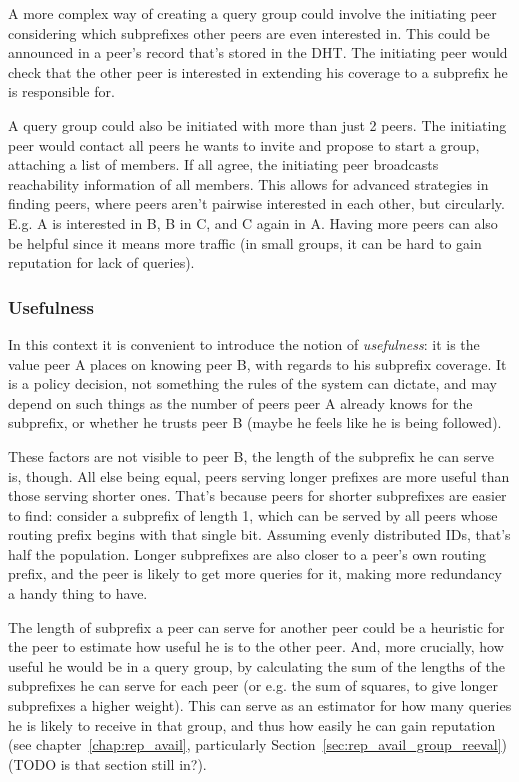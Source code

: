 A more complex way of creating a query group could involve the initiating peer
considering which subprefixes other peers are even interested in. This could be
announced in a peer's record that's stored in the DHT. The initiating peer would
check that the other peer is interested in extending his coverage to a subprefix
he is responsible for.

A query group could also be initiated with more than just 2 peers. The
initiating peer would contact all peers he wants to invite and propose to start
a group, attaching a list of members. If all agree, the initiating peer
broadcasts reachability information of all members. This allows for advanced
strategies in finding peers, where peers aren't pairwise interested in each
other, but circularly. E.g. A is interested in B, B in C, and C again in A.
Having more peers can also be helpful since it means more traffic (in small
groups, it can be hard to gain reputation for lack of queries).

\subsubsection{Usefulness}
\label{sec:desc_usefulness}
In this context it is convenient to introduce the notion of \emph{usefulness}:
it is the value peer A places on knowing peer B, with regards to his subprefix
coverage. It is a policy decision, not something the rules of the system can
dictate, and may depend on such things as the number of peers peer A already
knows for the subprefix, or whether he trusts peer B (maybe he feels like he is
being followed).

These factors are not visible to peer B, the length of the subprefix he can
serve is, though. All else being equal, peers serving longer prefixes are more
useful than those serving shorter ones. That's because peers for shorter
subprefixes are easier to find: consider a subprefix of length 1, which can be
served by all peers whose routing prefix begins with that single bit. Assuming
evenly distributed IDs, that's half the population. Longer subprefixes are also
closer to a peer's own routing prefix, and the peer is likely to get more
queries for it, making more redundancy a handy thing to have.

The length of subprefix a peer can serve for another peer could be a heuristic
for the peer to estimate how useful he is to the other peer. And, more
crucially, how useful he would be in a query group, by calculating the sum of
the lengths of the subprefixes he can serve for each peer (or e.g. the sum of
squares, to give longer subprefixes a higher weight). This can serve as an
estimator for how many queries he is likely to receive in that group, and thus
how easily he can gain reputation (see chapter~\ref{chap:rep_avail},
particularly Section~\ref{sec:rep_avail_group_reeval}) (TODO is that section
still in?).

